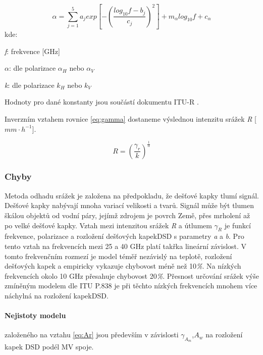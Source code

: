 \documentclass[a4paper,12pt]{report}
\begin{document}
\begin{equation}
\alpha=\sum_{j=1}^{5} a_{j} exp\left [ -\left ( \frac{log_{10}f-b_{j}}{c_{j}} \right )^{2} \right ]+m{_{\alpha }}log_{10}f+c_{\alpha }
\end{equation}
kde:

\emph{f}: frekvence [GHz]

\emph{$\alpha$}:  dle polarizace \emph{$\alpha_{H}$} nebo \emph{$\alpha_{V}$}

\emph{k}: dle polarizace  \emph{$k_{H}$} nebo \emph{$k_{V}$}

{\raggedright{}Hodnoty pro dané konstanty jsou součástí dokumentu ITU-R \cite{itu}.}
\bigskip

{\raggedright{}Inverzním vztahem rovnice \eqref{eq:gamma} dostaneme výslednou intenzitu srážek \emph{R} [$mm \cdot h^{-1}$]. }


\begin{equation}
R=\left ( \frac{\gamma_{r}}{k} \right )^{\frac{1}{\alpha }}
\end{equation}


\subsubsection{Chyby}
\label{subsec:chyby}
Metoda odhadu srážek je založena na předpokladu, že dešťové kapky tlumí signál. Dešťové kapky nabývají mnoha variací velikosti a tvarů. Signál může být tlumen škálou objektů od vodní páry, jejímž zdrojem je povrch Země, přes mrholení až po velké dešťové kapky. Vztah mezi intenzitou srážek \emph{R} a útlumem \emph{$\gamma_{R} $} je funkcí frekvence, polarizace a rozložení dešťových kapek\acs{DSD} s parametry \emph{a} a \emph{b}. Pro tento vztah na frekvencích mezi 25 a 40 GHz platí takřka lineární závislost. V tomto frekvenčním rozmezí je model téměř nezávislý na teplotě, rozložení dešťových kapek a empiricky vykazuje chybovost méně než 10\emph{\%}. Na nízkých frekvencích okolo 10 GHz přesahuje chybovost 20\emph{\%}. Přesnost určování srážek výše zmíněným modelem dle ITU P.838 je při těchto nízkých frekvencích mnohem více náchylná na rozložení kapek\acs{DSD}.\cite{dsd} 


\paragraph*{Nejistoty modelu} založeného na vztahu \eqref{eq:Ar} jsou především v závislosti \emph{$\gamma_{A_{m}} $},\emph{$A_{w} $} na rozložení kapek \acs{DSD} podél MV spoje.
\end{document}

